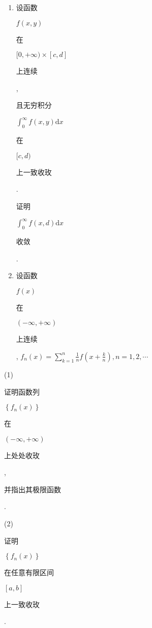 \documentclass[10pt]{article}
\begin{document}
\begin{enumerate}
  \item \begin{CJK}{UTF8}{mj}设函数\end{CJK} $f(x, y)$ \begin{CJK}{UTF8}{mj}在\end{CJK} $[0,+\infty) \times[c, d]$ \begin{CJK}{UTF8}{mj}上连续\end{CJK}, \begin{CJK}{UTF8}{mj}且无穷积分\end{CJK} $\int_{0}^{\infty} f(x, y) \mathrm{d} x$ \begin{CJK}{UTF8}{mj}在\end{CJK} $[c, d)$ \begin{CJK}{UTF8}{mj}上一致收玫\end{CJK}. \begin{CJK}{UTF8}{mj}证明\end{CJK} $\int_{0}^{\infty} f(x, d) \mathrm{d} x$ \begin{CJK}{UTF8}{mj}收敛\end{CJK}.

  \item \begin{CJK}{UTF8}{mj}设函数\end{CJK} $f(x)$ \begin{CJK}{UTF8}{mj}在\end{CJK} $(-\infty,+\infty)$ \begin{CJK}{UTF8}{mj}上连续\end{CJK}, $f_{n}(x)=\sum_{k=1}^{n} \frac{1}{n} f\left(x+\frac{k}{n}\right), n=1,2, \cdots$

\end{enumerate}
(1) \begin{CJK}{UTF8}{mj}证明函数列\end{CJK} $\left\{f_{n}(x)\right\}$ \begin{CJK}{UTF8}{mj}在\end{CJK} $(-\infty,+\infty)$ \begin{CJK}{UTF8}{mj}上处处收玫\end{CJK}, \begin{CJK}{UTF8}{mj}并指出其极限函数\end{CJK}.

(2) \begin{CJK}{UTF8}{mj}证明\end{CJK} $\left\{f_{n}(x)\right\}$ \begin{CJK}{UTF8}{mj}在任意有限区间\end{CJK} $[a, b]$ \begin{CJK}{UTF8}{mj}上一致收玫\end{CJK}.
\end{document}
